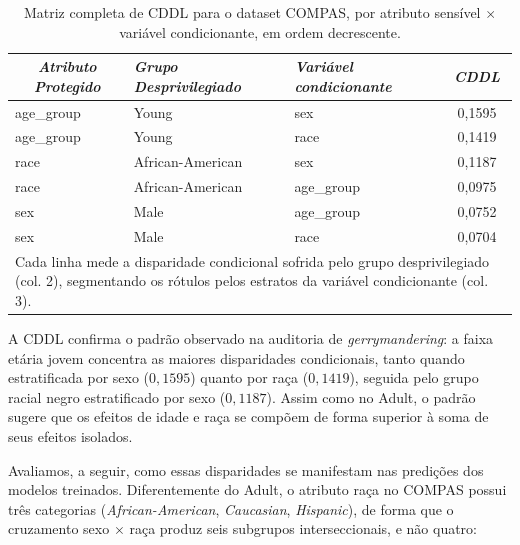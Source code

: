 \begin{table}[H]
    \centering
    \small
    \caption{Matriz completa de CDDL para o dataset COMPAS, por atributo sensível $\times$ variável condicionante, em ordem decrescente.}
    \vspace{2mm}
    \begin{tabular}{lll|c}
        \hline
        \multicolumn{1}{c}{\textit{Atributo Protegido}} & \textit{Grupo Desprivilegiado} & \textit{Variável condicionante} & \textit{CDDL} \\
        \hline
        age\_group & Young             & sex        & 0,1595 \\
        age\_group & Young             & race       & 0,1419 \\
        race       & African-American  & sex        & 0,1187 \\
        race       & African-American  & age\_group & 0,0975 \\
        sex        & Male              & age\_group & 0,0752 \\
        sex        & Male              & race       & 0,0704 \\
        \hline
        \multicolumn{4}{p{0.85\textwidth}}{\footnotesize Cada linha mede a disparidade condicional sofrida pelo grupo desprivilegiado (col. 2), segmentando os rótulos pelos estratos da variável condicionante (col. 3).}
    \end{tabular}
    \label{tab:compas_cddl}
\end{table}

A CDDL confirma o padrão observado na auditoria de \textit{gerrymandering}: a faixa etária jovem concentra as maiores disparidades condicionais, tanto quando estratificada por sexo ($0,1595$) quanto por raça ($0,1419$), seguida pelo grupo racial negro estratificado por sexo ($0,1187$). Assim como no Adult, o padrão sugere que os efeitos de idade e raça se compõem de forma superior à soma de seus efeitos isolados.

Avaliamos, a seguir, como essas disparidades se manifestam nas predições dos modelos treinados. Diferentemente do Adult, o atributo raça no COMPAS possui três categorias (\textit{African-American}, \textit{Caucasian}, \textit{Hispanic}), de forma que o cruzamento sexo $\times$ raça produz seis subgrupos interseccionais, e não quatro:

